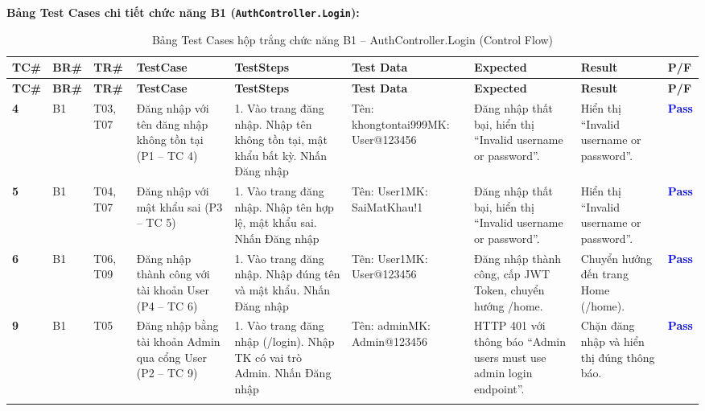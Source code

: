 \documentclass[11pt,a4paper]{article}
\begin{document}
\noindent\textbf{Bảng Test Cases chi tiết chức năng B1 (\texttt{AuthController.Login}):}
\begingroup
\scriptsize
\setlength{\tabcolsep}{3pt}
\begin{longtable}{|C{0.8cm}|C{0.75cm}|C{0.95cm}|L{2.0cm}|L{3.0cm}|L{2.25cm}|L{2.6cm}|L{2.5cm}|C{0.85cm}|}
\hline
{}
\textbf{TC\#} & \textbf{BR\#} & \textbf{TR\#} & \textbf{TestCase} & \textbf{TestSteps} & \textbf{Test Data} & \textbf{Expected} & \textbf{Result} & \textbf{P/F} \tabularnewline
\hline
\endfirsthead
\hline
{}
\textbf{TC\#} & \textbf{BR\#} & \textbf{TR\#} & \textbf{TestCase} & \textbf{TestSteps} & \textbf{Test Data} & \textbf{Expected} & \textbf{Result} & \textbf{P/F} \tabularnewline
\hline
\endhead
\hline
\endfoot
\textbf{4} & B1 & T03, T07 & Đăng nhập với tên đăng nhập không tồn tại (P1 -- TC 4) & 1. Vào trang đăng nhập. Nhập tên không tồn tại, mật khẩu bất kỳ. Nhấn Đăng nhập & Tên: khongtontai999\newline MK: User@123456 & Đăng nhập thất bại, hiển thị ``Invalid username or password''. & Hiển thị ``Invalid username or password''. & \textcolor{blue}{\textbf{Pass}} \\ \hline
\textbf{5} & B1 & T04, T07 & Đăng nhập với mật khẩu sai (P3 -- TC 5) & 1. Vào trang đăng nhập. Nhập tên hợp lệ, mật khẩu sai. Nhấn Đăng nhập & Tên: User1\newline MK: SaiMatKhau!1 & Đăng nhập thất bại, hiển thị ``Invalid username or password''. & Hiển thị ``Invalid username or password''. & \textcolor{blue}{\textbf{Pass}} \\ \hline
\textbf{6} & B1 & T06, T09 & Đăng nhập thành công với tài khoản User (P4 -- TC 6) & 1. Vào trang đăng nhập. Nhập đúng tên và mật khẩu. Nhấn Đăng nhập & Tên: User1\newline MK: User@123456 & Đăng nhập thành công, cấp JWT Token, chuyển hướng /home. & Chuyển hướng đến trang Home (/home). & \textcolor{blue}{\textbf{Pass}} \\ \hline
\textbf{9} & B1 & T05 & Đăng nhập bằng tài khoản Admin qua cổng User (P2 -- TC 9) & 1. Vào trang đăng nhập (/login). Nhập TK có vai trò Admin. Nhấn Đăng nhập & Tên: admin\newline MK: Admin@123456 & HTTP 401 với thông báo ``Admin users must use admin login endpoint''. & Chặn đăng nhập và hiển thị đúng thông báo. & \textcolor{blue}{\textbf{Pass}} \\ \hline
\caption{Bảng Test Cases hộp trắng chức năng B1 -- AuthController.Login (Control Flow)}
\end{longtable}
\endgroup
\end{document}
